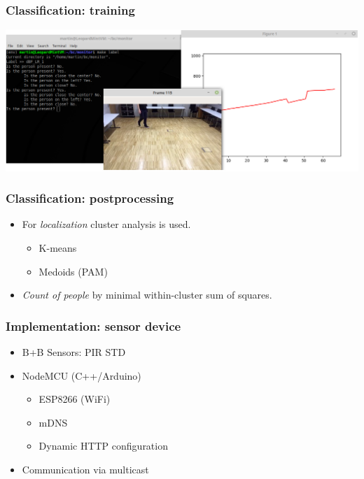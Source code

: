 \documentclass[10pt,xcolor=pdflatex]{beamer}
\begin{document}
\begin{frame}\frametitle{Classification: training}
    \begin{center}
        \includegraphics[width=1\textwidth]{img/labelling.png}
    \end{center}
\end{frame}

\begin{frame}\frametitle{Classification: postprocessing}
    \begin{itemize}
        \item For \emph{localization} cluster analysis is used.
            \begin{itemize}
                \item K-means
                \item Medoids (PAM)
            \end{itemize}
        \item \emph{Count of people} by minimal within-cluster sum of squares.
    \end{itemize}
\end{frame}

\begin{frame}\frametitle{Implementation: sensor device}
    \begin{itemize}
        \item B+B Sensors: PIR STD
        \item NodeMCU (C++/Arduino)
            \begin{itemize}
                \item ESP8266 (WiFi)
                \item mDNS
                \item Dynamic HTTP configuration
            \end{itemize}
        \item Communication via multicast
    \end{itemize}
\end{frame}
\end{document}

